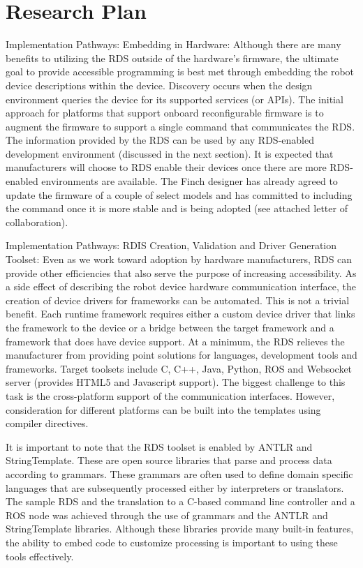 
\section{Research Plan}
\label{sec:research-plan}

Implementation Pathways: Embedding in Hardware: Although there are many benefits to utilizing the RDS outside of the hardware’s firmware, the ultimate goal to provide accessible programming is best met through embedding the robot device descriptions within the device.  Discovery occurs when the design environment queries the device for its supported services (or APIs).  The initial approach for platforms that support onboard reconfigurable firmware is to augment the firmware to support a single command that communicates the RDS.  The information provided by the RDS can be used by any RDS-enabled development environment (discussed in the next section).  It is expected that manufacturers will choose to RDS enable their devices once there are more RDS-enabled environments are available.  The Finch designer has already agreed to update the firmware of a couple of select models and has committed to including the command once it is more stable and is being adopted (see attached letter of collaboration).  

Implementation Pathways: RDIS Creation, Validation and Driver Generation Toolset: Even as we work toward adoption by hardware manufacturers, RDS can provide other efficiencies that also serve the purpose of increasing accessibility.   As a side effect of describing the robot device hardware communication interface, the creation of device drivers for frameworks can be automated.   This is not a trivial benefit.  Each runtime framework requires either a custom device driver that links the framework to the device or a bridge between the target framework and a framework that does have device support.   At a minimum, the RDS relieves the manufacturer from providing point solutions for languages, development tools and frameworks.  Target toolsets include C, C++, Java, Python, ROS and Websocket server (provides HTML5 and Javascript support).  The biggest challenge to this task is the cross-platform support of the communication interfaces.  However, consideration for different platforms can be built into the templates using compiler directives.

It is important to note that the RDS toolset is enabled by ANTLR and StringTemplate.  These are open source libraries that parse and process data according to grammars.  These grammars are often used to define domain specific languages that are subsequently processed either by interpreters or translators.  The sample RDS and the translation to a C-based command line controller and a ROS node was achieved through the use of grammars and the ANTLR and StringTemplate libraries.  Although these libraries provide many built-in features, the ability to embed code to customize processing is important to using these tools effectively.

